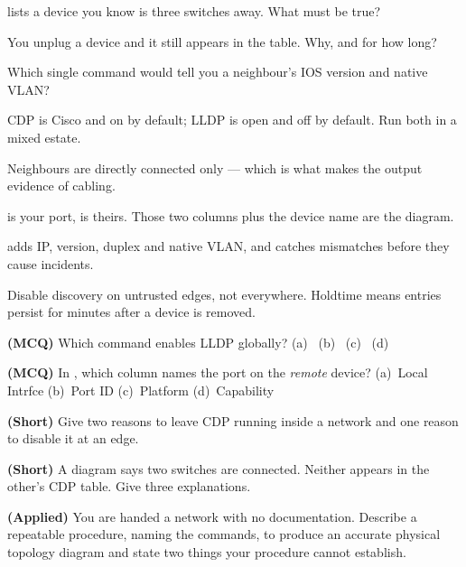 \begin{checkpoint}
\begin{tightnum}
  \item {} lists a device you know is three switches away.
        What must be true?
  \item You unplug a device and it still appears in the table. Why, and for how
        long?
  \item Which single command would tell you a neighbour's IOS version and native
        VLAN?
\end{tightnum}
\end{checkpoint}

\begin{chaptersummary}
\begin{tight}
  \item CDP is Cisco and on by default; LLDP is open and off by default. Run both
        in a mixed estate.
  \item Neighbours are directly connected only --- which is what makes the output
        evidence of cabling.
  \item {} is your port,  is theirs. Those two
        columns plus the device name are the diagram.
  \item {} adds IP, version, duplex and native VLAN, and catches
        mismatches before they cause incidents.
  \item Disable discovery on untrusted edges, not everywhere. Holdtime means
        entries persist for minutes after a device is removed.
\end{tight}
\end{chaptersummary}

\begin{reviewq}
  \item \textbf{(MCQ)} Which command enables LLDP globally?
        (a)~ (b)~ (c)~
        (d)~
  \item \textbf{(MCQ)} In , which column names the port
        on the \emph{remote} device?
        (a)~Local Intrfce (b)~Port ID (c)~Platform (d)~Capability
  \item \textbf{(Short)} Give two reasons to leave CDP running inside a network
        and one reason to disable it at an edge.
  \item \textbf{(Short)} A diagram says two switches are connected. Neither
        appears in the other's CDP table. Give three explanations.
  \item \textbf{(Applied)} You are handed a network with no documentation.
        Describe a repeatable procedure, naming the commands, to produce an
        accurate physical topology diagram and state two things your procedure
        cannot establish.
\end{reviewq}

